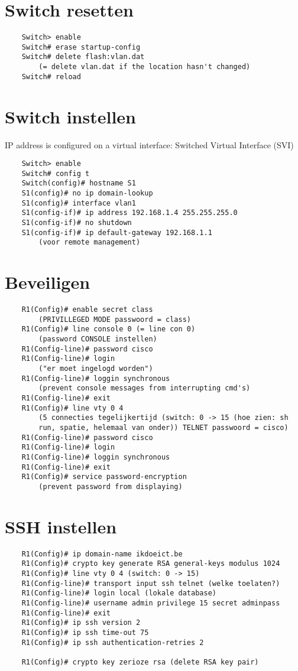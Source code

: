 \documentclass[10pt, a4paper]{article}
\begin{document}
	\section{Switch resetten}
	\begin{lstlisting}
	Switch> enable
	Switch# erase startup-config
	Switch# delete flash:vlan.dat
		(= delete vlan.dat if the location hasn't changed)
	Switch# reload
	\end{lstlisting}

	\section{Switch instellen}
	IP address is configured on a virtual interface: Switched Virtual Interface (SVI)\\
	\begin{lstlisting}
	Switch> enable
	Switch# config t
	Switch(config)# hostname S1
	S1(config)# no ip domain-lookup
	S1(config)# interface vlan1
	S1(config-if)# ip address 192.168.1.4 255.255.255.0
	S1(config-if)# no shutdown
	S1(config-if)# ip default-gateway 192.168.1.1
		(voor remote management)
	\end{lstlisting}

	\section{Beveiligen}
	\begin{lstlisting}
	R1(Config)# enable secret class
		(PRIVILLEGED MODE passwoord = class)
	R1(Config)# line console 0 (= line con 0)
		(password CONSOLE instellen)
	R1(Config-line)# password cisco
	R1(Config-line)# login
		("er moet ingelogd worden")
	R1(Config-line)# loggin synchronous
		(prevent console messages from interrupting cmd's)
	R1(Config-line)# exit
	R1(Config)# line vty 0 4
		(5 connecties tegelijkertijd (switch: 0 -> 15 (hoe zien: sh
		run, spatie, helemaal van onder)) TELNET passwoord = cisco)
	R1(Config-line)# password cisco
	R1(Config-line)# login
	R1(Config-line)# loggin synchronous
	R1(Config-line)# exit
	R1(Config)# service password-encryption
		(prevent password from displaying)
	\end{lstlisting}

	\section{SSH instellen}
	\begin{lstlisting}
	R1(Config)# ip domain-name ikdoeict.be
	R1(Config)# crypto key generate RSA general-keys modulus 1024
	R1(Config)# line vty 0 4 (switch: 0 -> 15)
	R1(Config-line)# transport input ssh telnet (welke toelaten?)
	R1(Config-line)# login local (lokale database)
	R1(Config-line)# username admin privilege 15 secret adminpass
	R1(Config-line)# exit
	R1(Config)# ip ssh version 2
	R1(Config)# ip ssh time-out 75
	R1(Config)# ip ssh authentication-retries 2

	R1(Config)# crypto key zerioze rsa (delete RSA key pair)
	\end{lstlisting}
\end{document}

